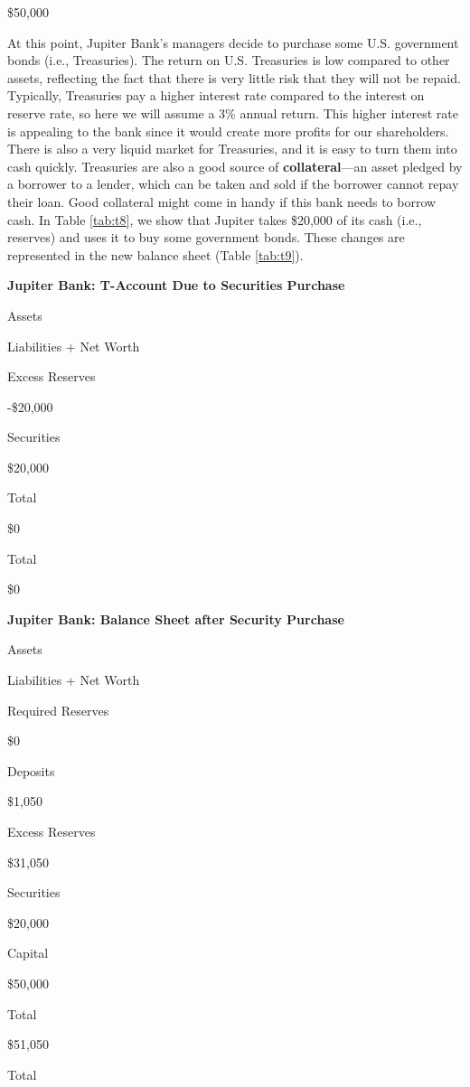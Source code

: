 \documentclass[
]{book}
\begin{document}
\$50,000

At this point, Jupiter Bank's managers decide to purchase some U.S. government bonds (i.e., Treasuries). The return on U.S. Treasuries is low compared to other assets, reflecting the fact that there is very little risk that they will not be repaid. Typically, Treasuries pay a higher interest rate compared to the interest on reserve rate, so here we will assume a 3\% annual return. This higher interest rate is appealing to the bank since it would create more profits for our shareholders. There is also a very liquid market for Treasuries, and it is easy to turn them into cash quickly. Treasuries are also a good source of \textbf{collateral}---an asset pledged by a borrower to a lender, which can be taken and sold if the borrower cannot repay their loan. Good collateral might come in handy if this bank needs to borrow cash. In Table \ref{tab:t8}, we show that Jupiter takes \$20,000 of its cash (i.e., reserves) and uses it to buy some government bonds. These changes are represented in the new balance sheet (Table \ref{tab:t9}).

\label{tab:t8}\textbf{Jupiter Bank: T-Account Due to Securities Purchase}

Assets

Liabilities + Net Worth

Excess Reserves

-\$20,000

Securities

\$20,000

Total

\$0

Total

\$0

\label{tab:t9}\textbf{Jupiter Bank: Balance Sheet after Security Purchase}

Assets

Liabilities + Net Worth

Required Reserves

\$0

Deposits

\$1,050

Excess Reserves

\$31,050

Securities

\$20,000

Capital

\$50,000

Total

\$51,050

Total
\end{document}
